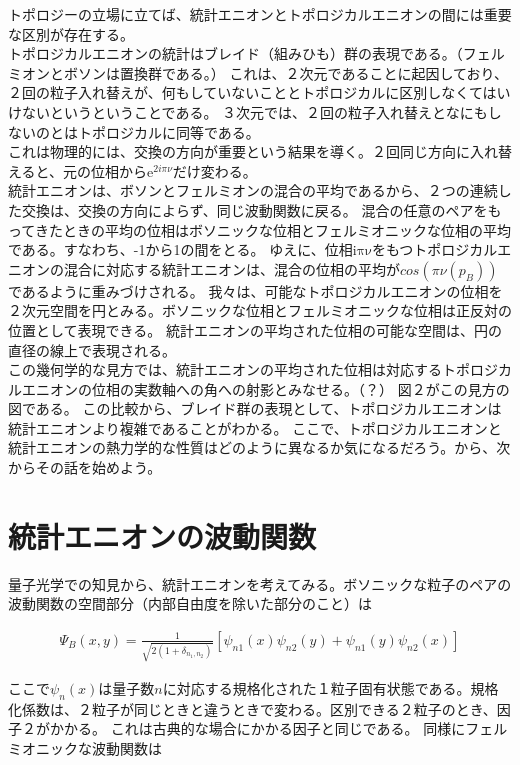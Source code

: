 \documentclass[a4paper,11pt]{jsarticle}
\numberwithin{equation}{section}
\begin{document}
トポロジーの立場に立てば、統計エニオンとトポロジカルエニオンの間には重要な区別が存在する。\\
トポロジカルエニオンの統計はブレイド（組みひも）群の表現である。（フェルミオンとボソンは置換群である。）
これは、２次元であることに起因しており、２回の粒子入れ替えが、何もしていないこととトポロジカルに区別しなくてはいけないというということである。
３次元では、２回の粒子入れ替えとなにもしないのとはトポロジカルに同等である。\\
これは物理的には、交換の方向が重要という結果を導く。２回同じ方向に入れ替えると、元の位相から$\mathrm{e}^{2i\pi \nu}$だけ変わる。\\
統計エニオンは、ボソンとフェルミオンの混合の平均であるから、２つの連続した交換は、交換の方向によらず、同じ波動関数に戻る。
混合の任意のペアをもってきたときの平均の位相はボソニックな位相とフェルミオニックな位相の平均である。すなわち、-1から1の間をとる。
ゆえに、位相$\mathrm{i\pi \nu}$をもつトポロジカルエニオンの混合に対応する統計エニオンは、混合の位相の平均が$cos(\pi \nu(p_B))$であるように重みづけされる。
我々は、可能なトポロジカルエニオンの位相を２次元空間を円とみる。ボソニックな位相とフェルミオニックな位相は正反対の位置として表現できる。
統計エニオンの平均された位相の可能な空間は、円の直径の線上で表現される。\\

この幾何学的な見方では、統計エニオンの平均された位相は対応するトポロジカルエニオンの位相の実数軸への角への射影とみなせる。（？）
図２がこの見方の図である。
この比較から、ブレイド群の表現として、トポロジカルエニオンは統計エニオンより複雑であることがわかる。
ここで、トポロジカルエニオンと統計エニオンの熱力学的な性質はどのように異なるか気になるだろう。から、次からその話を始めよう。

\section{統計エニオンの波動関数}
量子光学での知見から、統計エニオンを考えてみる。ボソニックな粒子のペアの波動関数の空間部分（内部自由度を除いた部分のこと）は

\begin{align}
\Psi_B(x,y) = \frac{1}{\sqrt{2(1+\delta_{n_1,n_2})}}[\psi_{n1}(x)\psi_{n2}(y)+\psi_{n1}(y)\psi_{n2}(x)]
\end{align}

ここで$\psi_n(x)$は量子数$n$に対応する規格化された１粒子固有状態である。規格化係数は、２粒子が同じときと違うときで変わる。区別できる２粒子のとき、因子２がかかる。
これは古典的な場合にかかる因子と同じである。
同様にフェルミオニックな波動関数は
\end{document}
